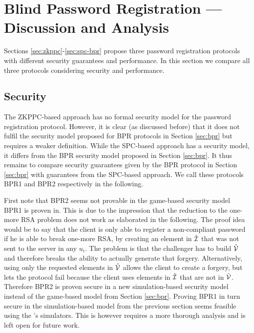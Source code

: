 \section{Blind Password Registration --- Discussion and Analysis} \label{sec:discussion}

Sections \ref{sec:zkppc}-\ref{sec:spc-bpr} propose three password registration protocols with different security guarantees and performance.
In this section we compare all three protocols considering security and performance.

\subsection{Security} \label{sec:bpr-security-analysis}
The \ac{ZKPPC}-based approach has no formal security model for the password registration protocol.
However, it is clear (as discussed before) that it does not fulfil the security model proposed for \ac{BPR} protocols in Section \ref{sec:bpr} but requires a weaker definition.
While the \ac{SPC}-based approach has a security model, it differs from the \ac{BPR} security model proposed in Section \ref{sec:bpr}.
It thus remains to compare security guarantees given by the \ac{BPR} protocol in Section \ref{sec:bpr} with guarantees from the \ac{SPC}-based approach.
We call these protocols BPR1 and BPR2 respectively in the following.

First note that BPR2 seems not provable in the game-based security model BPR1 is proven in.
This is due to the impression that the reduction to the one-more RSA problem does not work as elaborated in the following.
The proof idea would be to say that the client is only able to register a non-compliant password if he is able to break one-more RSA, \ie by creating an
element in $\hat{\mathcal{I}}$ that was not sent to the server in any $u_i$. 
The problem is that the challenger has to build $\hat{\mathcal{V}}$ and therefore breaks the ability to actually generate that forgery. 
Alternatively, using only the requested elements in $\hat{\mathcal{V}}$ allows the client to create a forgery, but lets the protocol fail because the client uses elements in $\hat{\mathcal{I}}$ that are not in $\hat{\mathcal{V}}$.
Therefore BPR2 is proven secure in a new simulation-based security model instead of the game-based model from Section \ref{sec:bpr}.
Proving BPR1 in turn secure in the simulation-based model from the previous section seems feasible using the \ZKP's simulators.
This is however requires a more thorough analysis and is left open for future work.

